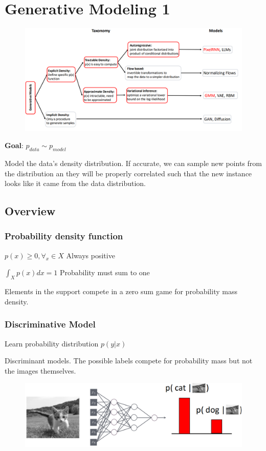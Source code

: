 \section{Generative Modeling 1}

\begin{figure}[!h]
    \includegraphics[width = \columnwidth]{figures/GenAI1/GenAIOverview.png}
\end{figure}
\textbf{Goal}: \(p_{data} \sim p_{model}\)

Model the data's density distribution.
If accurate, we can sample  new points from the distribution an they will be properly correlated such that the new instance looks like it came from the data distribution.
\subsection{Overview}
\subsubsection{Probability density function}
\(p(x) \ge 0, \forall_x \in X\) Always positive 

\(\int_X p(x)dx = 1\) Probability must sum to one

Elements in the support compete in a zero sum game for probability mass density.
\subsubsection{Discriminative Model}
Learn probability distribution \(p(y|x)\)

Discriminant models.
The possible labels compete for probability mass but not the images themselves.
\begin{figure}[!h]
    \includegraphics[width = \columnwidth]{figures/GenAI1/DiscriminativeModel.png}
\end{figure}


